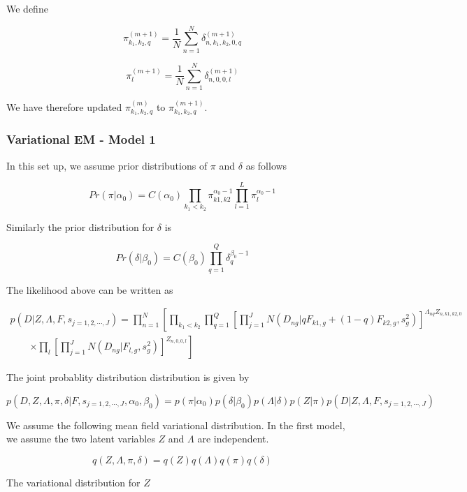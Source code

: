\documentclass[12pt]{article}
\begin{document}
We define 

$$ \pi^{(m+1)}_{k_1, k_2, q} = \frac{1}{N}\sum_{n=1}^{N} \delta^{(m+1)}_{n, k_1, k_2, 0, q} $$

$$ \pi^{(m+1)}_{l} = \frac{1}{N}\sum_{n=1}^{N} \delta^{(m+1)}_{n, 0, 0, l} $$

We have therefore updated $\pi^{(m)}_{k_1, k_2, q}$ to $\pi^{(m+1)}_{k_1, k_2, q}$.


\subsubsection{Variational EM  - Model 1}

In this set up, we assume prior distributions of $\pi$ and $\delta$ as follows

$$ Pr (\pi | \alpha_{0}) = C (\alpha_0) \prod_{k_1 < k_2} \pi_{k1, k2}^{\alpha_0 -1} \prod_{l=1}^{L} \pi_{l}^{\alpha_0 -1}$$

Similarly the prior distribution for $\delta$ is 

$$ Pr (\delta | \beta_0) = C (\beta_0) \prod_{q=1}^{Q} \delta_{q}^{\beta_0 -1 }  $$

The likelihood above can be written as 

\begin{multline}
p (D | Z, \Lambda, F, s_{j=1,2,\cdots,J}) = \prod_{n=1}^{N} \left [ \prod_{k_1 < k_2} \prod_{q=1}^{Q} \left [ \prod_{j=1}^{J} N (D_{ng} | qF_{k1,g} + (1-q)F_{k2,g}, s^2_{g}) \right ]^{\Lambda_{nq}Z_{n, k1, k2, 0}}   \right. \\
\qquad \left. \times \prod_{l} \left [ \prod_{j=1}^{J} N (D_{ng} | F_{l,g}, s^2_{g}) \right ]^{Z_{n, 0, 0, l}} \right] 
\end{multline}

The joint probablity distribution distribution is given by 

$$ p (D, Z, \Lambda, \pi, \delta | F, s_{j=1,2,\cdots,J}, \alpha_{0}, \beta_{0}) = p (\pi | \alpha_0) p (\delta | \beta_0)  p (\Lambda | \delta) p (Z | \pi) p (D | Z, \Lambda, F, s_{j=1,2,\cdots,J})  $$


We assume the following mean field variational distribution. In the first model, we assume the two latent variables $Z$ and $\Lambda$ are independent. 

$$ q(Z, \Lambda, \pi, \delta) = q(Z) q(\Lambda) q(\pi) q(\delta) $$

The variational distribution for $Z$
\end{document}

